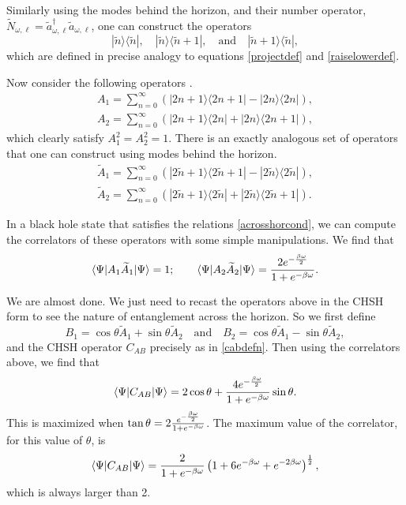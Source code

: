 \documentclass[12pt]{article}
\def\schwarzn{N}
\newcommand{\cop}[1]{#1}
\def\ta{\widetilde{\cop{a}}}
\newcommand{\be}{\begin{equation}}
\newcommand{\ee}{\end{equation}}
\begin{document}
Similarly using the modes behind the horizon, and their number operator, $\widetilde{\schwarzn}_{\omega, \ell} = \ta_{\omega, \ell}^{\dagger} \ta_{\omega, \ell}$, one can construct the operators
\[
|\widetilde{n} \rangle \langle \widetilde{n} |, \quad  |\widetilde{n} \rangle \langle \widetilde{n}+1|, \quad \text{and} \quad |\widetilde{n} + 1\rangle \langle \widetilde{n}|,
\]
which are defined in precise analogy to equations \eqref{projectdef} and \eqref{raiselowerdef}.

Now consider the following operators \cite{chen2002maximal}.
\be
\label{a1a2def}
\begin{split}
A_1 = \sum_{n=0}^{\infty} \left( |2 n + 1 \rangle \langle 2 n + 1| - |2 n \rangle \langle 2 n| \right), \\
A_2 = \sum_{n=0}^{\infty} \left( |2 n + 1 \rangle \langle 2 n| +  |2 n \rangle \langle 2 n + 1| \right),
\end{split}
\ee
which clearly satisfy $A_1^2 = A_2^2 = 1$.
There is an exactly analogous set of operators that one can construct using modes behind the horizon.
\be
\begin{split}
\widetilde{A}_1 = \sum_{n=0}^{\infty} \left(|2 \widetilde{n} + 1 \rangle \langle 2 \widetilde{n} + 1| - |2 \widetilde{n} \rangle \langle 2 \widetilde{n}| \right), \\
\widetilde{A}_2 = \sum_{n=0}^{\infty} \left(|2 \widetilde{n} + 1 \rangle \langle 2 \widetilde{n}| +  |2 \widetilde{n} \rangle \langle 2 \widetilde{n} + 1| \right).
\end{split}
\ee

In a black hole state that satisfies the relations \eqref{acrosshorcond}, we can compute the correlators of these operators with some simple manipulations. We find that
\be
\langle \Psi | A_1 \widetilde{A}_1 | \Psi \rangle = 1; \qquad \langle \Psi | A_2 \widetilde{A}_2 | \Psi \rangle = {2 e^{-{\beta \omega \over 2}} \over 1 + e^{-\beta \omega}}.
\ee


We are almost done. We just need to recast the operators above in the CHSH form to see the nature of entanglement across the horizon. So we first define
\be
B_1 = \cos \theta \widetilde{A}_1 + \sin \theta \widetilde{A}_2  \quad \text{and}  \quad B_2 = \cos \theta \widetilde{A}_1 - \sin \theta \widetilde{A}_2,
\ee
and the CHSH operator $C_{AB}$ precisely as in \eqref{cabdefn}. Then using the correlators above, we find that
\be
\langle \Psi | C_{AB} |\Psi \rangle =  2 \cos \theta + {4 e^{-{\beta \omega \over 2}} \over 1 + e^{-{\beta \omega}}}\sin \theta .
\ee
This is maximized when $\tan \theta  = 2 {e^{-{\beta \omega \over 2}} \over 1 + e^{-{\beta \omega}}}$. The maximum value of the correlator, for this value of $\theta$,  is
\be
\label{maxentacross}
\langle \Psi | C_{AB} |\Psi  \rangle = {2 \over 1 + e^{-\beta \omega}} \left(1 + 6 e^{-{\beta \omega}} + e^{-2{\beta \omega}} \right)^{1 \over 2},
\ee
which is always larger than 2.
\end{document}
